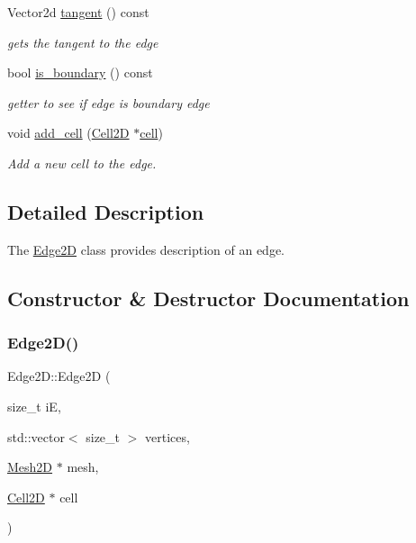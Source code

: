 \begin{DoxyCompactItemize}
\mbox{\label{classHCore2D_1_1Edge2D_a033c6a0827f54b2adf059942d17468d6}} 
Vector2d \hyperlink{classHCore2D_1_1Edge2D_a033c6a0827f54b2adf059942d17468d6}{tangent} () const
\begin{DoxyCompactList}\small\item\em gets the tangent to the edge \end{DoxyCompactList}\item 
bool \hyperlink{group__Mesh2D_gaec0df956c23b28f39dfd297a9426d25b}{is\+\_\+boundary} () const
\begin{DoxyCompactList}\small\item\em getter to see if edge is boundary edge \end{DoxyCompactList}\item 
\mbox{\label{classHCore2D_1_1Edge2D_a206bd371085de27b2d404eef6c1cadae}} 
void \hyperlink{classHCore2D_1_1Edge2D_a206bd371085de27b2d404eef6c1cadae}{add\+\_\+cell} (\hyperlink{classHCore2D_1_1Cell2D}{Cell2D} $\ast$\hyperlink{classHCore2D_1_1Edge2D_aec9ba58af7a02bd31c4275edde79b5c6}{cell})
\begin{DoxyCompactList}\small\item\em Add a new cell to the edge. \end{DoxyCompactList}\end{DoxyCompactItemize}


\subsection{Detailed Description}
The \hyperlink{classHCore2D_1_1Edge2D}{Edge2D} class provides description of an edge. 

\subsection{Constructor \& Destructor Documentation}
\mbox{\label{classHCore2D_1_1Edge2D_af3b982ed5bedc795c29e621a675a9137}} 
\subsubsection{\texorpdfstring{Edge2\+D()}{Edge2D()}}
{\footnotesize\ttfamily Edge2\+D\+::\+Edge2D (\begin{DoxyParamCaption}\item[{size\+\_\+t}]{iE,  }\item[{std\+::vector$<$ size\+\_\+t $>$}]{vertices,  }\item[{\hyperlink{classHCore2D_1_1Mesh2D}{Mesh2D} $\ast$}]{mesh,  }\item[{\hyperlink{classHCore2D_1_1Cell2D}{Cell2D} $\ast$}]{cell }\end{DoxyParamCaption})}

